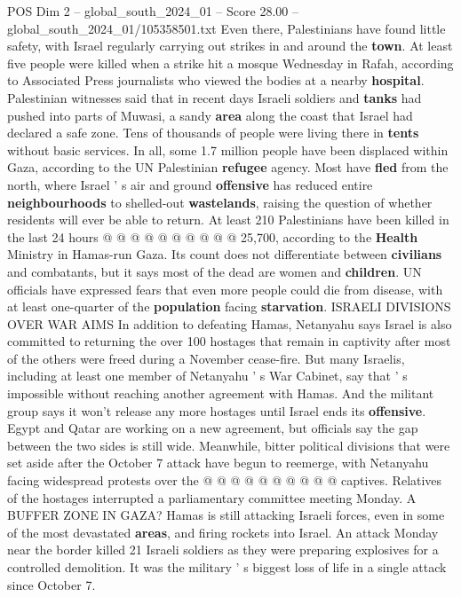 \begin{textsample}{POS Dim 2 – global\_south\_2024\_01 – Score 28.00 – global\_south\_2024\_01/105358501.txt}
Even there, Palestinians have found little safety, with Israel regularly carrying out strikes in and around the \textbf{town}.
At least five people were killed when a strike hit a mosque Wednesday in Rafah, according to Associated Press journalists who viewed the bodies at a nearby \textbf{hospital}.
Palestinian witnesses said that in recent days Israeli soldiers and \textbf{tanks} had pushed into parts of Muwasi, a sandy \textbf{area} along the coast that Israel had declared a safe zone.
Tens of thousands of people were living there in \textbf{tents} without basic services.
In all, some 1.7 million people have been displaced within Gaza, according to the UN Palestinian \textbf{refugee} agency.
Most have \textbf{fled} from the north, where Israel ' s air and ground \textbf{offensive} has reduced entire \textbf{neighbourhoods} to shelled-out \textbf{wastelands}, raising the question of whether residents will ever be able to return.
At least 210 Palestinians have been killed in the last 24 hours @ @ @ @ @ @ @ @ @ @ 25,700, according to the \textbf{Health} Ministry in Hamas-run Gaza.
Its count does not differentiate between \textbf{civilians} and combatants, but it says most of the dead are women and \textbf{children}.
UN officials have expressed fears that even more people could die from disease, with at least one-quarter of the \textbf{population} facing \textbf{starvation}.
ISRAELI DIVISIONS OVER WAR AIMS In addition to defeating Hamas, Netanyahu says Israel is also committed to returning the over 100 hostages that remain in captivity after most of the others were freed during a November cease-fire.
But many Israelis, including at least one member of Netanyahu ' s War Cabinet, say that ' s impossible without reaching another agreement with Hamas.
And the militant group says it won't release any more hostages until Israel ends its \textbf{offensive}.
Egypt and Qatar are working on a new agreement, but officials say the gap between the two sides is still wide.
Meanwhile, bitter political divisions that were set aside after the October 7 attack have begun to reemerge, with Netanyahu facing widespread protests over the @ @ @ @ @ @ @ @ @ @ captives.
Relatives of the hostages interrupted a parliamentary committee meeting Monday.
A BUFFER ZONE IN GAZA?
Hamas is still attacking Israeli forces, even in some of the most devastated \textbf{areas}, and firing rockets into Israel.
An attack Monday near the border killed 21 Israeli soldiers as they were preparing explosives for a controlled demolition.
It was the military ' s biggest loss of life in a single attack since October 7.

\end{textsample}

